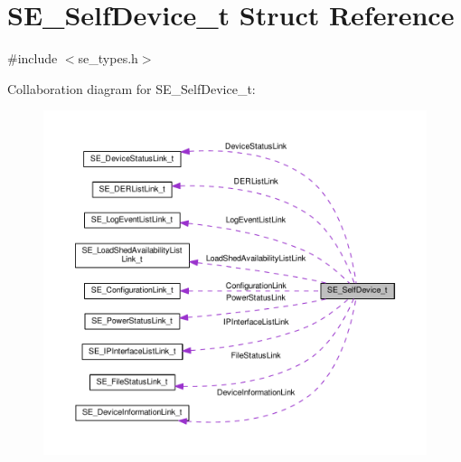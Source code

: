 \hypertarget{structSE__SelfDevice__t}{}\section{S\+E\+\_\+\+Self\+Device\+\_\+t Struct Reference}
\label{structSE__SelfDevice__t}


{\ttfamily \#include $<$se\+\_\+types.\+h$>$}



Collaboration diagram for S\+E\+\_\+\+Self\+Device\+\_\+t\+:\nopagebreak
\begin{figure}[H]
\begin{center}
\leavevmode
\includegraphics[width=350pt]{structSE__SelfDevice__t__coll__graph}
\end{center}
\end{figure}

